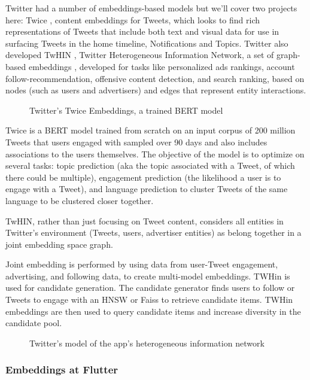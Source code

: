 \documentclass[11pt, table]{diazessay} %
\begin{document}
\begin{sloppypar}
Twitter had a number of embeddings-based models but we'll cover two projects here: Twice \citep{liu2022twice}, content embeddings for Tweets, which looks to find rich representations of Tweets that include both text and visual data for use in surfacing Tweets in the home timeline, Notifications and Topics. Twitter also developed TwHIN \citep{el2022twhin}, Twitter Heterogeneous Information Network, a set of graph-based embeddings \citep{el2022twhin}, developed for tasks like personalized ads rankings, account follow-recommendation, offensive content detection, and search ranking, based on nodes (such as users and advertisers) and edges that represent entity interactions.

\begin{figure}[H]
\caption{Twitter's Twice Embeddings, a trained BERT model \citep{liu2022twice}}
\end{figure}


Twice is a BERT model trained from scratch on an input corpus of 200 million Tweets that users engaged with sampled over 90 days and also includes associations to the users themselves. The objective of the model is to optimize on several tasks: topic prediction (aka the topic associated with a Tweet, of which there could be multiple), engagement prediction (the likelihood a user is to engage with a Tweet), and language prediction to cluster Tweets of the same language to be clustered closer together.


TwHIN, rather than just focusing on Tweet content, considers all entities in Twitter's environment (Tweets, users, advertiser entities) as belong together in a joint embedding space graph.

Joint embedding is performed by using data from user-Tweet engagement, advertising, and following data, to create multi-model embeddings. TWHin is used for candidate generation. The candidate generator finds users to follow or Tweets to engage with an HNSW or Faiss to retrieve candidate items. TWHin embeddings are then used to query candidate items and increase diversity in the candidate pool.

\begin{figure}[H]
\caption{Twitter's model of the app's heterogeneous information network \citep{el2022twhin}}
\end{figure}


\subsubsection*{Embeddings at Flutter}


\end{sloppypar}
\end{document}
